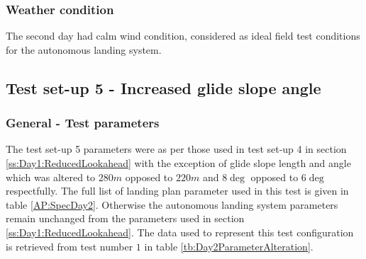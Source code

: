 \subsubsection{Weather condition}
The second day had calm wind condition, considered as ideal field test conditions for the autonomous landing system.
\subsection{Test set-up 5 - Increased glide slope angle}\label{ss:Day2GlideSlope}
\subsubsection{General - Test parameters}
The test set-up 5 parameters were as per those used in test set-up 4 in section \ref{ss:Day1:ReducedLookahead} with the exception of glide slope length and angle which was altered to $280 m$ opposed to $220 m$ and $8 \deg$ opposed to $6 \deg$ respectfully. The full list of landing plan parameter used in this test is given in table \ref{AP:SpecDay2}. Otherwise the autonomous landing system parameters remain unchanged from the parameters used in section \ref{ss:Day1:ReducedLookahead}. The data used to represent this test configuration is retrieved from test number $1$ in table \ref{tb:Day2ParameterAlteration}.
